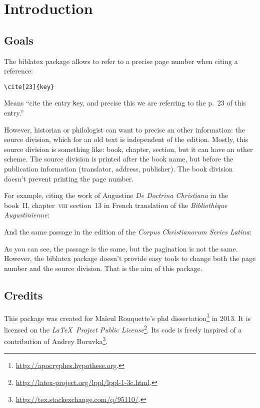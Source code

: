 \documentclass{ltxdockit}[2011/03/25]
\newcommand{\biblatex}{biblatex\xspace}
\newcommand{\bibkey}[1]{\texttt #1}
\begin{document}
\printtitlepage

\tableofcontents
\section{Introduction}
\subsection{Goals}
The \biblatex package allows to refer to a precise page number when citing a reference:
\begin{verbatim}
\cite[23]{key}
\end{verbatim}

Means \enquote{cite the entry {\bibkey key}, and precise this we are referring to the p.~23 of this entry.}

However, historian or philologist can want to precise an other information: the source division, which for an old text is independent of the edition. Mostly, this source division is something like: book, chapter, section, but it can have an other scheme. The source division is printed after the book name, but before the publication information (translator, address, publisher). The book division doesn't prevent printing the page number. 

For example,  citing the work of Augustine \emph{De Doctrina Christiana} in the book~II, chapter~\textsc{viii} section~13 in French translation of the \emph{Bibliothèque Augustinienne}:

\begin{quotation}
\cite[(II, \textsc{viii}, 13)152-154]{Augustin_DeDoctChr_BA}
\end{quotation}

And the same passage in the edition of the \emph{Corpus Christianorum Series Latina}:
\begin{quotation}
\cite[(II, \textsc{viii}, 13)39-40]{Augustin_DeDoctChr_CCSL}
\end{quotation}

As you can see, the passage is the same, but the pagination is not the same.
However, the biblatex package doesn't provide easy tools to change both the page number and the source division. That is the aim of this package.
\subsection{Credits}

This package was created for Maïeul Rouquette's phd dissertation\footnote{\url{http://apocryphes.hypothese.org}.} in 2013. It is licensed on the \emph{\LaTeX\ Project Public License}\footnote{\url{http://latex-project.org/lppl/lppl-1-3c.html}.}. 
Its code is freely inspired of a contribution of Andrey Boruvka\footnote{\url{http://tex.stackexchange.com/q/95110/}.}.
\end{document}
